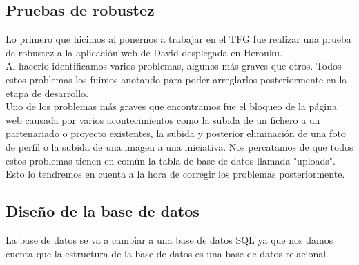 \documentclass{article}
\begin{document}
\subsection{Pruebas de robustez}
Lo primero que hicimos al ponernos a trabajar en el TFG fue realizar una prueba de robustez a la aplicación web de David desplegada en Herouku.\\
Al hacerlo identificamos varios problemas, algunos más graves que otros. Todos estos problemas los fuimos anotando para poder arreglarlos posteriormente en la etapa de desarrollo.\\
Uno de los problemas más graves que encontramos fue el bloqueo de la página web causada por varios acontecimientos como la subida de un fichero a un partenariado o proyecto existentes, la subida y posterior eliminación de una foto de perfil o la subida de una imagen a una iniciativa. Nos percatamos de que todos estos problemas tienen en común la tabla de base de datos llamada "uploads". Esto lo tendremos en cuenta a la hora de corregir los problemas 
posteriormente.

\subsection{Diseño de la base de datos}
La base de datos se va a cambiar a una base de datos SQL ya que nos damos cuenta que la estructura de la base de datos es una base de datos relacional.
\end{document}
